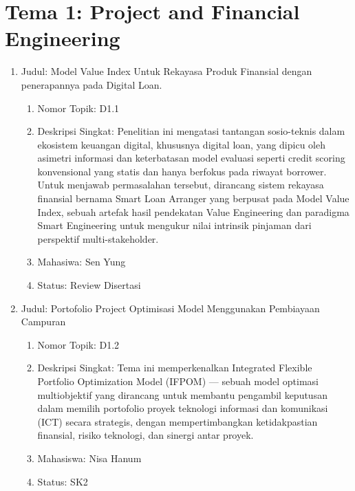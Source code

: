 \documentclass[
  letterpaper,
  DIV=11,
  numbers=noendperiod]{scrreprt}
\begin{document}
\section{Tema 1: Project and Financial
Engineering}\label{tema-1-project-and-financial-engineering}

\begin{enumerate}
\def\labelenumi{\arabic{enumi}.}
\item
  Judul: Model Value Index Untuk Rekayasa Produk Finansial dengan
  penerapannya pada Digital Loan.

  \begin{enumerate}
  \def\labelenumii{\arabic{enumii}.}
  \item
    Nomor Topik: D1.1
  \item
    Deskripsi Singkat: Penelitian ini mengatasi tantangan sosio-teknis
    dalam ekosistem keuangan digital, khususnya digital loan, yang
    dipicu oleh asimetri informasi dan keterbatasan model evaluasi
    seperti credit scoring konvensional yang statis dan hanya berfokus
    pada riwayat borrower. Untuk menjawab permasalahan tersebut,
    dirancang sistem rekayasa finansial bernama Smart Loan Arranger yang
    berpusat pada Model Value Index, sebuah artefak hasil pendekatan
    Value Engineering dan paradigma Smart Engineering untuk mengukur
    nilai intrinsik pinjaman dari perspektif multi-stakeholder.
  \item
    Mahasiwa: Sen Yung
  \item
    Status: Review Disertasi
  \end{enumerate}
\item
  Judul: Portofolio Project Optimisasi Model Menggunakan Pembiayaan
  Campuran

  \begin{enumerate}
  \def\labelenumii{\arabic{enumii}.}
  \item
    Nomor Topik: D1.2
  \item
    Deskripsi Singkat: Tema ini memperkenalkan Integrated Flexible
    Portfolio Optimization Model (IFPOM) --- sebuah model optimasi
    multiobjektif yang dirancang untuk membantu pengambil keputusan
    dalam memilih portofolio proyek teknologi informasi dan komunikasi
    (ICT) secara strategis, dengan mempertimbangkan ketidakpastian
    finansial, risiko teknologi, dan sinergi antar proyek.
  \item
    Mahasiswa: Nisa Hanum
  \item
    Status: SK2
  \end{enumerate}
\end{enumerate}
\end{document}
